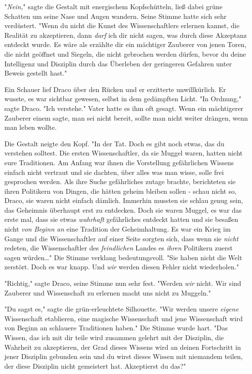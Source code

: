 {"\emph{Nein,}" sagte die Gestalt mit energischem Kopfschütteln, ließ dabei grüne Schatten um seine Nase und Augen wandern. Seine Stimme hatte sich sehr verdüstert. "Wenn du nicht die Kunst des Wissenschaftlers erlernen kannst, die Realität zu akzeptieren, dann \emph{darf} ich dir nicht sagen, was durch diese Akzeptanz entdeckt wurde. Es wäre als erzählte dir ein mächtiger Zauberer von jenen Toren, die nicht geöffnet und Siegeln, die nicht gebrochen werden dürfen, bevor du deine Intelligenz und Disziplin durch das Überleben der geringeren Gefahren unter Beweis gestellt hast."

Ein Schauer lief Draco über den Rücken und er erzitterte unwillkürlich. Er wusste, es war sichtbar gewesen, selbst in dem gedämpften Licht. "In Ordnung," sagte Draco. "Ich verstehe." Vater hatte es ihm oft gesagt. Wenn ein mächtigerer Zauberer einem sagte, man sei nicht bereit, sollte man nicht weiter drängen, wenn man leben wollte.

Die Gestalt neigte den Kopf. "In der Tat. Doch es gibt noch etwas, das du verstehen solltest. Die ersten Wissenschaftler, da sie Muggel waren, hatten nicht eure Traditionen. Am Anfang war ihnen die Vorstellung gefährlichen Wissens einfach nicht vertraut und sie dachten, über alles was man wisse, solle frei gesprochen werden. Als ihre Suche gefährliches zutage brachte, berichteten sie ihren Politikern von Dingen, die hätten geheim bleiben sollen - schau nicht so, Draco, sie waren nicht einfach dämlich. Immerhin mussten sie schlau genug sein, das Geheimnis überhaupt erst zu entdecken. Doch sie waren Muggel, es war das erste mal, dass sie etwas \emph{wahrhaft} gefährliches entdeckt hatten und sie besaßen nicht \emph{von Beginn an} eine Tradition der Geheimhaltung. Es war ein Krieg im Gange und die Wissenschaftler auf einer Seite sorgten sich, dass wenn sie \emph{nicht} redeten, die Wissenschaftler des \emph{feindlichen} Landes es \emph{ihren} Politikern zuerst sagen würden…" Die Stimme verklang bedeutungsvoll. "Sie haben nicht die Welt zerstört. Doch es war knapp. Und \emph{wir} werden diesen Fehler nicht wiederholen."

"Richtig," sagte Draco, seine Stimme nun sehr fest. "Werden \emph{wir} nicht. Wir sind Zauberer und Wissenschaft zu erlernen macht uns nicht zu Muggeln."

"Du sagst es," sagte die grün-erleuchtete Silhouette. "Wir werden unsere \emph{eigene} Wissenschaft etablieren, eine magische Wissenschaft und jene Wissenschaft wird von Beginn an schlauere Traditionen haben." Die Stimme wurde hart. "Das Wissen, das ich mit dir teile wird zusammen gelehrt mit der Disziplin, die Wahrheit zu akzeptieren, der Grad dieses Wissens wird an deinen Fortschritt in jener Disziplin gebunden sein und du wirst dieses Wissen mit niemandem teilen, der diese Disziplin nicht gemeistert hat. Akzeptierst du das?"

}
